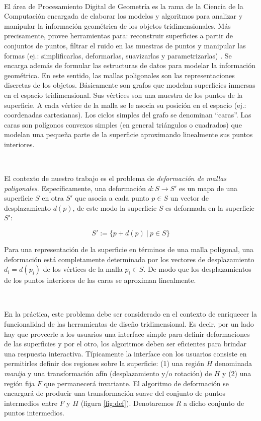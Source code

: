 \documentclass{article}
\begin{document}
\

El área de Procesamiento Digital de Geometría es la rama de la Ciencia 
de la Computación encargada de elaborar los modelos y algoritmos para 
analizar y manipular la información geométrica de los objetos 
tridimensionales. Más precisamente, provee herramientas para: reconstruir 
superficies a partir de conjuntos de puntos, filtrar el ruido en las 
muestras de puntos y manipular las formas (ej.: simplificarlas, deformarlas,
 suavizarlas y parametrizarlas) \cite{BKPAL:2010}. Se encarga además de 
 formular las estructuras de datos para modelar la información geométrica. 
 En este sentido, las mallas poligonales son las representaciones discretas 
 de los  objetos. Básicamente son grafos \cite{Harari:1969} que modelan 
 superficies inmersas en el espacio tridimensional. Sus vértices son  
 una muestra de los puntos de la superficie. A cada vértice de la 
 malla se le asocia su posición en el espacio (ej.: coordenadas cartesianas). 
 Los ciclos simples del grafo se denominan “caras”. Las caras son polígonos 
 convexos simples (en general triángulos o cuadrados) que modelan una pequeña 
 parte de la superficie aproximando linealmente sus puntos interiores.

\

El contexto de nuestro trabajo es el problema de \emph{deformación de mallas 
poligonales}. Específicamente, una deformación $d: S \rightarrow S'$ es un 
mapa de una superficie $S$ en otra $S'$ que asocia a cada punto $p \in S$ 
un vector de desplazamiento $d(p)$, de este modo la superficie $S$ es 
deformada en la superficie $S'$:

$$S' := \{p + d(p) \ | \ p \in S\}$$

Para una representación de la superficie en términos de una malla poligonal, 
una deformación está completamente determinada por los vectores de desplazamiento 
$d_i = d(p_i)$ de los vértices de la malla $p_i \in S$. De modo que los 
desplazamientos de los puntos interiores de las caras se aproximan linealmente.

\

En la práctica, este problema debe ser considerado en el contexto de enriquecer 
la funcionalidad de las herramientas de diseño tridimensional. Es decir, por 
un lado hay que proveerle a los usuarios una interface simple para definir 
deformaciones de las superficies y por el otro, los algoritmos deben ser eficientes 
para brindar una respuesta interactiva. Típicamente la interface con los 
usuarios consiste en permitirles definir dos regiones sobre la superficie: 
(1) una región $H$ denominada \emph{manija} y una transformación afín (desplazamiento 
y/o rotación) de $H$ y (2) una región fija $F$ que permanecerá invariante. 
El algoritmo de deformación se encargará de producir una transformación 
suave del conjunto de puntos intermedios entre $F$ y $H$ (figura \ref{fig:def}). 
Denotaremos $R$ a dicho conjunto de puntos intermedios.
\end{document}

